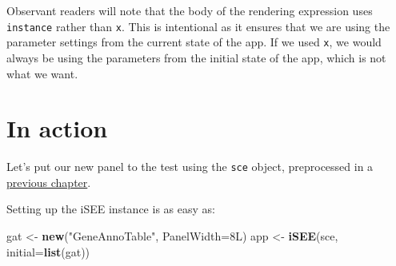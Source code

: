 \documentclass[
]{book}
\newenvironment{Shaded}{\begin{snugshade}}{\end{snugshade}}
\newcommand{\DataTypeTok}[1]{\textcolor[rgb]{0.13,0.29,0.53}{#1}}
\newcommand{\KeywordTok}[1]{\textcolor[rgb]{0.13,0.29,0.53}{\textbf{#1}}}
\newcommand{\NormalTok}[1]{#1}
\newcommand{\OperatorTok}[1]{\textcolor[rgb]{0.81,0.36,0.00}{\textbf{#1}}}
\newcommand{\StringTok}[1]{\textcolor[rgb]{0.31,0.60,0.02}{#1}}
\begin{document}
\begin{Shaded}
\end{Shaded}

Observant readers will note that the body of the rendering expression uses \texttt{instance} rather than \texttt{x}.
This is intentional as it ensures that we are using the parameter settings from the current state of the app.
If we used \texttt{x}, we would always be using the parameters from the initial state of the app, which is not what we want.

\hypertarget{in-action}{%
\section{In action}\label{in-action}}

Let's put our new panel to the test using the \texttt{sce} object, preprocessed in a \protect\hyperlink{developing}{previous chapter}.

Setting up the iSEE instance is as easy as:

\begin{Shaded}
\begin{Highlighting}[]
\NormalTok{gat <-}\StringTok{ }\KeywordTok{new}\NormalTok{(}\StringTok{"GeneAnnoTable"}\NormalTok{, }\DataTypeTok{PanelWidth=}\NormalTok{8L)}
\NormalTok{app <-}\StringTok{ }\KeywordTok{iSEE}\NormalTok{(sce, }\DataTypeTok{initial=}\KeywordTok{list}\NormalTok{(gat))}
\end{Highlighting}
\end{Shaded}
\end{document}
